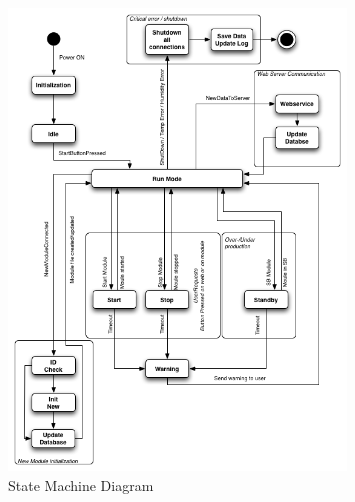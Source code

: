 	\begin{figure}[H]
		\begin{centering}
			 \includegraphics[width=0.8\textwidth]{images/statemachine.png}
		\caption{State Machine Diagram}
	 	\end{centering}
	\end{figure}

